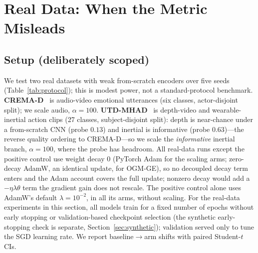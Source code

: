 \documentclass[conference]{IEEEtran}
\begin{document}
\section{Real Data: When the Metric Misleads}
\label{sec:real}
\subsection{Setup (deliberately scoped)}
We test two real datasets with weak from-scratch encoders over five seeds (Table~\ref{tab:protocol}); this is modest power, not a standard-protocol benchmark. \textbf{CREMA-D}~\cite{cao2014crema} is audio-video emotional utterances (six classes, actor-disjoint split); we scale audio, $\alpha{=}100$. \textbf{UTD-MHAD}~\cite{chen2015utd} is depth-video and wearable-inertial action clips (27 classes, subject-disjoint split): depth is near-chance under a from-scratch CNN (probe $0.13$) and inertial is informative (probe $0.63$)---the reverse quality ordering to CREMA-D---so we scale the \emph{informative} inertial branch, $\alpha{=}100$, where the probe has headroom. All real-data runs except the positive control use weight decay $0$ (PyTorch Adam for the scaling arms; zero-decay AdamW, an identical update, for OGM-GE), so no decoupled decay term enters and the Adam account covers the full update; nonzero decay would add a $-\eta\lambda\theta$ term the gradient gain does not rescale. The positive control alone uses AdamW's default $\lambda{=}10^{-2}$, in all its arms, without scaling. For the real-data experiments in this section, all models train for a fixed number of epochs without early stopping or validation-based checkpoint selection (the synthetic early-stopping check is separate, Section~\ref{sec:synthetic}); validation served only to tune the SGD learning rate. We report baseline$\to$arm shifts with paired Student-$t$ CIs.
\end{document}
